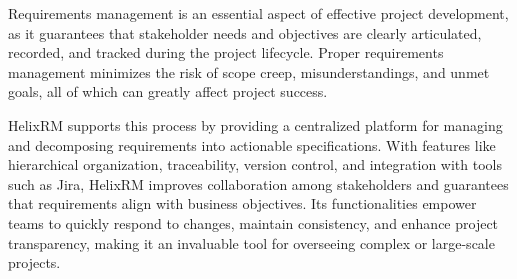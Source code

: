 Requirements management is an essential aspect of effective project development,
as it guarantees that stakeholder needs and objectives are clearly articulated,
recorded, and tracked during the project lifecycle.
Proper requirements management minimizes the risk of scope creep, misunderstandings,
and unmet goals, all of which can greatly affect project success.

HelixRM supports this process by providing a centralized platform for managing and
decomposing requirements into actionable specifications.
With features like hierarchical organization, traceability, version control,
and integration with tools such as Jira, HelixRM improves collaboration among
stakeholders and guarantees that requirements align with business objectives.
Its functionalities empower teams to quickly respond to changes, maintain consistency,
and enhance project transparency, making it an invaluable tool for overseeing
complex or large-scale projects.
